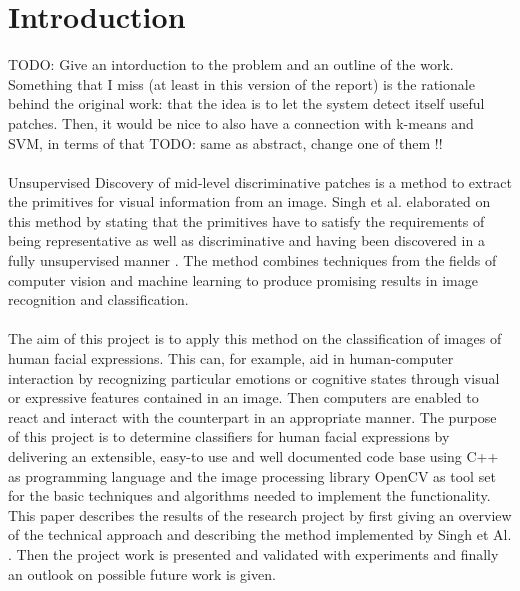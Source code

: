 
\section{Introduction}\label{sec:Introduction}

TODO: Give an intorduction to the problem and an outline of the work. Something that I miss (at least in this version of the report) is the rationale behind the original work: that the idea is to let the system detect itself useful patches. Then, it would be nice to also have a connection with k-means and SVM, in terms of that
TODO: same as abstract, change one of them !!
\\
\\
Unsupervised Discovery of mid-level discriminative patches is a method to extract the primitives for visual information from an image.  Singh et al. elaborated on this method by stating that the primitives have to satisfy the requirements of being representative as well as discriminative and having been discovered in a fully unsupervised manner \cite{Singh2012DiscPat}. The method combines techniques from the fields of computer vision and machine learning to produce promising results in image recognition and classification. 
\\
\\
The aim of this project is to apply this method on the classification of images of human facial expressions. This can, for example, aid in human-computer interaction by recognizing particular emotions or cognitive states through visual or expressive features contained in an image. Then computers are enabled to react and interact with the counterpart in an appropriate manner. The purpose of this project is to determine classifiers for human facial expressions by delivering an extensible, easy-to use and well documented code base using C++ as programming language and the image processing library OpenCV as tool set for the basic techniques and algorithms needed to implement the functionality. This paper describes the results of the research project by first giving an overview of the technical approach and describing the method implemented by Singh et Al. \cite{Singh2012DiscPat}. Then the project work is presented and validated with experiments and finally an outlook on possible future work is given.